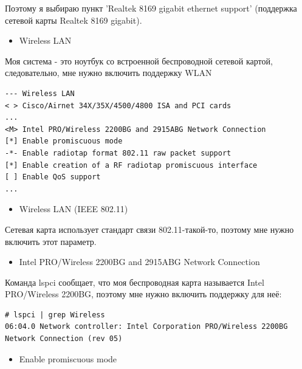 \documentclass[10pt]{book}
\begin{document}
Поэтому я выбираю пункт  'Realtek 8169 gigabit ethernet support' (поддержка сетевой карты Realtek 8169 gigabit).

\begin{itemize}
\item Wireless LAN
\end{itemize}

Моя система - это ноутбук со встроенной беспроводной сетевой картой, следовательно, мне нужно включить поддержку WLAN

\vspace{3mm}
\begin{tcolorbox}[colback=gray!14!white, colframe=blue!75!blue]
\begin{lstlisting}
--- Wireless LAN
< > Cisco/Airnet 34X/35X/4500/4800 ISA and PCI cards
...
<M> Intel PRO/Wireless 2200BG and 2915ABG Network Connection
[*] Enable promiscuous mode
-*- Enable radiotap format 802.11 raw packet support
[*] Enable creation of a RF radiotap promiscuous interface
[ ] Enable QoS support
...
\end{lstlisting}
\end{tcolorbox}

\begin{itemize}
\item Wireless LAN (IEEE 802.11)
\end{itemize}

Сетевая карта использует стандарт связи 802.11-такой-то, поэтому мне нужно включить этот параметр.

\begin{itemize}
\item Intel PRO/Wireless 2200BG and 2915ABG Network Connection
\end{itemize}

Команда lspci сообщает, что моя беспроводная карта называется Intel PRO/Wireless 2200BG, поэтому мне нужно включить поддержку для неё:

\vspace{3mm}
\begin{tcolorbox}
\begin{lstlisting}
# lspci | grep Wireless
06:04.0 Network controller: Intel Corporation PRO/Wireless 2200BG Network Connection (rev 05)
\end{lstlisting}
\end{tcolorbox}

\begin{itemize}
\item Enable promiscuous mode
\end{itemize}
\end{document}
